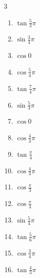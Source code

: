 \begin{multicols}{3}
\begin{enumerate}
  \item $\displaystyle \tan{\frac{5}{3}\pi}$

  \item $\displaystyle \sin{\frac{3}{4}\pi}$

  \item $\displaystyle \cos{0}$
        \phantom{$\displaystyle =1$}

  \item $\displaystyle \cos{\frac{5}{4}\pi}$

  \item $\displaystyle \tan{\frac{7}{4}\pi}$
        \phantom{$\displaystyle =-1$}

  \item $\displaystyle \sin{\frac{5}{3}\pi}$

  \item $\displaystyle \cos{0}$
        \phantom{$\displaystyle =1$}

  \item $\displaystyle \cos{\frac{4}{3}\pi}$

  \item $\displaystyle \tan{\frac{\pi}{4}}$
        \phantom{$\displaystyle =1$}

  \item $\displaystyle \cos{\frac{4}{3}\pi}$

  \item $\displaystyle \cos{\frac{\pi}{3}}$

  \item $\displaystyle \cos{\frac{\pi}{4}}$

  \item $\displaystyle \sin{\frac{5}{4}\pi}$

  \item $\displaystyle \tan{\frac{5}{6}\pi}$

  \item $\displaystyle \cos{\frac{3}{4}\pi}$

  \item $\displaystyle \tan{\frac{4}{3}\pi}$


\end{enumerate}
\end{multicols}
